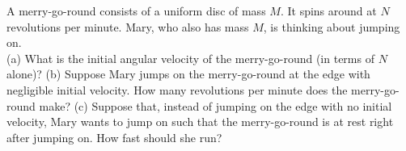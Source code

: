 A merry-go-round consists of a uniform disc of mass $M$.
It spins around at $N$
revolutions per minute. Mary, who also has mass $M$, is thinking about
jumping on.\\
%
(a) What is the initial angular velocity of the merry-go-round (in
terms of $N$ alone)?\answercheck\hwendpart
%
(b) Suppose Mary jumps on the merry-go-round at the edge with
negligible initial velocity. How many revolutions per minute does the
merry-go-round make?\answercheck\hwendpart
%
(c) Suppose that, instead of jumping on the edge with no initial
velocity, Mary wants to jump on such that the merry-go-round is at
rest right after jumping on. How fast should she run?\answercheck
